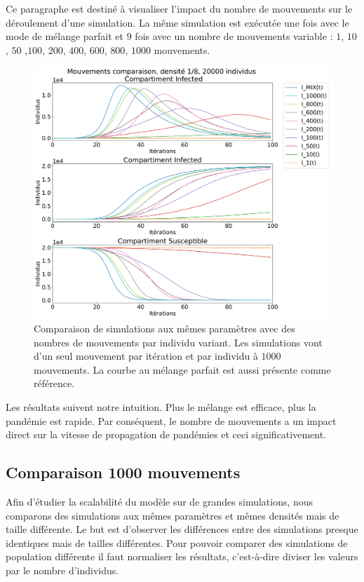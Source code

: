 Ce paragraphe est destiné à visualiser l'impact du nombre de mouvements sur le déroulement d'une simulation. La même simulation est exécutée une fois avec le mode de mélange parfait et $9$ fois avec un nombre de mouvements variable : $1$, $10$, $50$ ,$100$, $200$, $400$, $600$, $800$, $1000$ mouvements.

\begin{figure}[h]
	\centering
	\captionsetup{justification=centering}
	\includegraphics[width=.8\textwidth]{Images/SIR_mouvements_variables.pdf}
	\caption[Mouvements variable : SIR]{Comparaison de simulations aux mêmes paramètres avec des nombres de mouvements par individu variant. Les simulations vont d'un seul mouvement par itération et par individu à $1000$ mouvements. La courbe au mélange parfait est aussi présente comme référence.}
\end{figure}

Les résultats suivent notre intuition. Plus le mélange est efficace, plus la pandémie est rapide. Par conséquent, le nombre de mouvements a un impact direct sur la vitesse de propagation de pandémies et ceci significativement. 

\newpage

\subsection{Comparaison 1000 mouvements}

Afin d'étudier la scalabilité du modèle sur de grandes simulations, nous comparons des simulations aux mêmes paramètres et mêmes densités mais de taille différente. Le but est d'observer les différences entre des simulations presque identiques mais de tailles différentes. Pour pouvoir comparer des simulations de population différente il faut normaliser les résultats, c'est-à-dire diviser les valeurs par le nombre d'individus.\\


